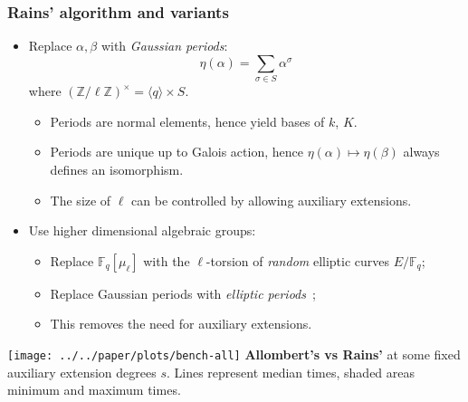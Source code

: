 \documentclass[francais]{beamer}
\def\Z {\ensuremath{\mathbb{Z}}}
\def\F {\ensuremath{\mathbb{F}}}
\begin{document}
\begin{frame}\frametitle{Rains' algorithm and variants}
    \begin{itemize}
    \item Replace $\alpha,\beta$ with \emph{Gaussian periods}:
      \[\eta(\alpha) = \sum_{\sigma\in S}\alpha^\sigma\]
      where $(\Z/\ell\Z)^\times = \langle q\rangle \times S$.
    \begin{itemize}
    \item Periods are normal elements, hence yield bases of $k$, $K$.
    \item Periods are unique up to Galois action, hence $\eta(\alpha)\mapsto\eta(\beta)$ always defines an isomorphism.
      \item The size of $\ell$ can be controlled by allowing auxiliary extensions.
    \end{itemize}
    \end{itemize}
    \begin{itemize}
    \item Use higher dimensional algebraic groups:
  \begin{itemize}
  \item Replace $\F_q[\mu_\ell]$ with the $\ell$-torsion of
    \emph{random} elliptic curves $E/\F_q$;
  \item Replace Gaussian periods with \emph{elliptic
      periods}~\cite{mihailescu+morain+schost07};
  \item This removes the need for auxiliary extensions.
  \end{itemize}
      \end{itemize}
\end{frame}

\begin{frame}
    \centering
    \texttt{[image: ../../paper/plots/bench-all]}
    \flushleft
      \textbf{Allombert's vs Rains'} at some fixed auxiliary extension
      degrees $s$. Lines represent median times, shaded areas minimum
      and maximum times.
\end{frame}


\newcommand{\ie}{\emph{i.e. }}
\newcommand{\eg}{\emph{e.g. }}
\newcommand{\embed}[2]{\phi_{#1\hookrightarrow#2}}
\end{document}
